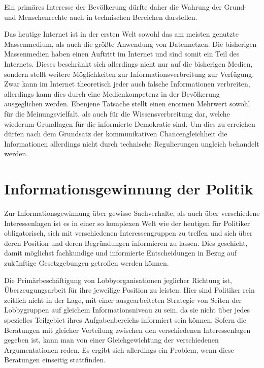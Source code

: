 \documentclass[
	12pt,
	a4paper,
	BCOR10mm,
	DIV14,
	listof=totoc,
	bibliography=totoc,
	headsepline
]{scrreprt}
\begin{document}
Ein primäres Interesse der Bevölkerung dürfte daher die Wahrung der Grund- und Menschenrechte auch in technischen Bereichen darstellen.

Das heutige Internet ist in der ersten Welt sowohl das am meisten genutzte Massenmedium, als auch die größte Anwendung von Datennetzen.
Die bisherigen Massenmedien haben einen Auftritt im Internet und sind somit ein Teil des Internets.
Dieses beschränkt sich allerdings nicht nur auf die bisherigen Medien, sondern stellt weitere Möglichkeiten zur Informationsverbreitung zur Verfügung.
Zwar kann im Internet theoretisch jeder auch falsche Informationen verbreiten, allerdings kann dies durch eine Medienkompetenz in der Bevölkerung ausgeglichen werden.
Ebenjene Tatsache stellt einen enormen Mehrwert sowohl für die Meinungsvielfalt, als auch für die Wissensverbreitung dar, welche wiederum Grundlagen für die informierte Demokratie sind.
Um dies zu erreichen dürfen nach dem Grundsatz der kommunikativen Chancengleichheit die Informationen allerdings nicht durch technische Regulierungen ungleich behandelt werden.




\section{Informationsgewinnung der Politik}
\label{lobby}
Zur Informationsgewinnung über gewisse Sachverhalte, als auch über verschiedene Interessenlagen ist es in einer so komplexen Welt wie der heutigen für Politiker obligatorisch, sich mit verschiedenen Interessengruppen zu treffen und sich über deren Position und deren Begründungen informieren zu lassen.
Dies geschieht, damit möglichst fachkundige und informierte Entscheidungen in Bezug auf zukünftige Gesetzgebungen getroffen werden können. 

Die Primärbeschäftigung von Lobbyorganisationen jeglicher Richtung ist, Überzeugungsarbeit für ihre jeweilige Position zu leisten.
Hier sind Politiker rein zeitlich nicht in der Lage, mit einer ausgearbeiteten Strategie von Seiten der Lobbygruppen auf gleichem Informationsniveau zu sein, da sie nicht über jedes spezielles Teilgebiet ihres Aufgabenbereichs informiert sein können.
Sofern die Beratungen mit gleicher Verteilung zwischen den verschiedenen Interessenlagen gegeben ist, kann man von einer Gleichgewichtung der verschiedenen Argumentationen reden.
Es ergibt sich allerdings ein Problem, wenn diese Beratungen einseitig stattfinden. 
\end{document}
